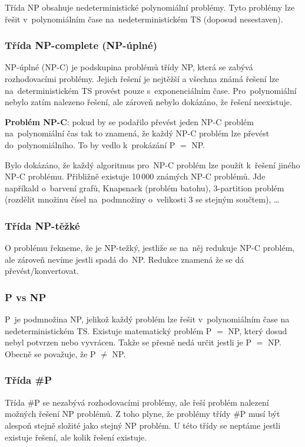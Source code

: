 Třída NP obsahuje nedeterministické polynomiální problémy. 
Tyto problémy lze řešit v~polynomiálním čase na~nedeterministickém TS (doposud nesestaven).

\subsubsection{Třída NP-complete (NP-úplné)}

NP-úplné (NP-C) je podskupina problémů třídy NP, která se zabývá rozhodovacími problémy.
Jejich řešení je nejtěžší a všechna známá řešení lze na~deterministickém TS provést pouze s~exponenciálním čase. 
Pro~polynomiální nebylo zatím nalezeno řešení, ale zároveň nebylo dokázáno, že řešení neexistuje.

\textbf{Problém NP-C}: pokud by se podařilo převést jeden NP-C problém na~polynomiální čas tak to znamená, že každý NP-C problém lze převést do~polynomiálního. 
To by vedlo k~prokázání P $=$ NP.

Bylo dokázáno, že každý algoritmus pro~NP-C problém lze použít k~řešení jiného \mbox{NP-C} problému.
Přibližně existuje 10\,000 známých NP-C problémů.
Jde napříkald o~barvení grafů, Knapsnack (problém batohu), 3-partition problém (rozdělit množinu čísel na~podmnožiny o~velikosti 3 se stejným součtem), \dots

\subsubsection{Třída NP-těžké}

O problému řekneme, že je NP-težký, jestliže se na~něj redukuje NP-C problém, ale zároveň nevíme jestli spadá do~NP.
Redukce znamená že se dá převést/konvertovat.

\subsubsection{P vs NP}

P~je podmnožina NP, jelikož každý problém lze řešit v~polynomiálním čase na
 nedeterministickém TS.
Existuje matematický problém P $=$ NP, který dosud nebyl potvrzen nebo vyvrácen. Takže se přesně nedá určit jestli je P $=$ NP. 
Obecně se považuje, že P $\neq$ NP.

\subsubsection{Třída \#P}

Třída \#P se nezabývá rozhodovacími problémy, ale řeší problém nalezení možných řešení NP problémů. 
Z toho plyne, že problémy třídy \#P musí být alespoň stejně složité jako stejný NP problém.
U této třídy se neptáme jestli existuje řešení, ale kolik řešení existuje.

